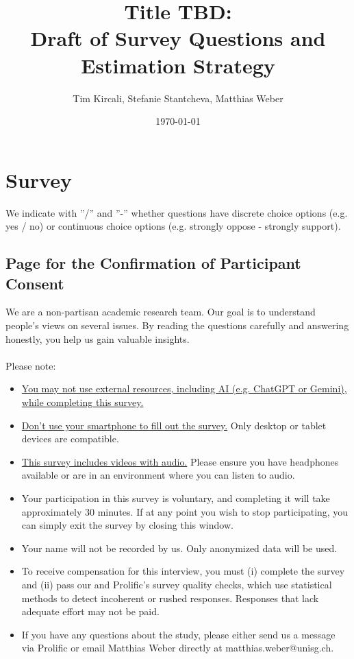 \documentclass[11pt]{article}
\title{Title TBD:\\Draft of Survey Questions and Estimation Strategy}
\author{Tim Kircali, Stefanie Stantcheva, Matthias Weber}
\date{\today} %
\begin{document}
\maketitle
\tableofcontents
\section{Survey}
\noindent We indicate with ”/” and ”-” whether questions have discrete choice options (e.g. yes / no) or continuous choice options (e.g. strongly oppose - strongly support). 
\subsection*{Page for the Confirmation of Participant Consent}
We are a non-partisan academic research team. Our goal is to understand people's views on several issues. By reading the questions carefully and answering honestly, you help us gain valuable insights.
\\
\\
\noindent Please note: 
\begin{itemize}
    \item \uline{You may not use external resources, including AI (e.g. ChatGPT or Gemini), while completing this survey.}
    \item \uline{Don't use your smartphone to fill out the survey.} Only desktop or tablet devices are compatible.
    \item \uline{This survey includes videos with audio.} Please ensure you have headphones available or are in an environment where you can listen to audio.
    \item Your participation in this survey is voluntary, and completing it will take approximately 30 minutes. If at any point you wish to stop participating, you can simply exit the survey by closing this window.
    \item Your name will not be recorded by us. Only anonymized data will be used.
    \item To receive compensation for this interview, you must (i) complete the survey and (ii) pass our and Prolific’s survey quality checks, which use statistical methods to detect incoherent or rushed responses. Responses that lack adequate effort may not be paid. 
    \item If you have any questions about the study, please either send us a message via Prolific or email Matthias Weber directly at matthias.weber@unisg.ch.
\end{itemize}
\end{document}
